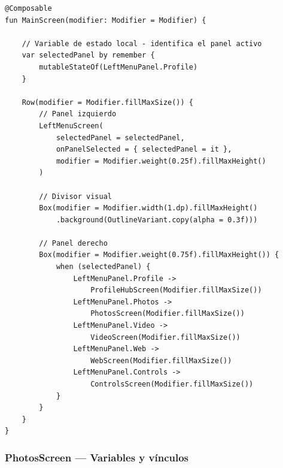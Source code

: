 \documentclass[stu, 12pt, letterpaper, donotrepeattitle, floatsintext, natbib]{apa7}
\begin{document}
\begin{lstlisting}[caption={Variables y vínculos en MainScreen.kt --- Layout de dos paneles}]
@Composable
fun MainScreen(modifier: Modifier = Modifier) {

    // Variable de estado local - identifica el panel activo
    var selectedPanel by remember {
        mutableStateOf(LeftMenuPanel.Profile)
    }

    Row(modifier = Modifier.fillMaxSize()) {
        // Panel izquierdo
        LeftMenuScreen(
            selectedPanel = selectedPanel,
            onPanelSelected = { selectedPanel = it },
            modifier = Modifier.weight(0.25f).fillMaxHeight()
        )

        // Divisor visual
        Box(modifier = Modifier.width(1.dp).fillMaxHeight()
            .background(OutlineVariant.copy(alpha = 0.3f)))

        // Panel derecho
        Box(modifier = Modifier.weight(0.75f).fillMaxHeight()) {
            when (selectedPanel) {
                LeftMenuPanel.Profile ->
                    ProfileHubScreen(Modifier.fillMaxSize())
                LeftMenuPanel.Photos ->
                    PhotosScreen(Modifier.fillMaxSize())
                LeftMenuPanel.Video ->
                    VideoScreen(Modifier.fillMaxSize())
                LeftMenuPanel.Web ->
                    WebScreen(Modifier.fillMaxSize())
                LeftMenuPanel.Controls ->
                    ControlsScreen(Modifier.fillMaxSize())
            }
        }
    }
}
\end{lstlisting}

\subsubsection{PhotosScreen --- Variables y vínculos}
\end{document}

